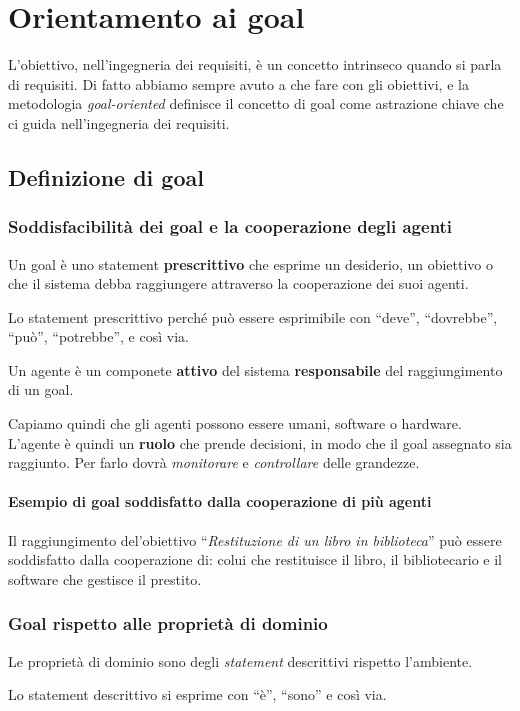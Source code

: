 \chapter{Orientamento ai goal}
L'obiettivo, nell'ingegneria dei requisiti, è un concetto intrinseco quando 
si parla di requisiti.
Di fatto abbiamo sempre avuto a che fare con gli obiettivi, e la metodologia
\textit{goal-oriented} definisce il concetto di goal come astrazione chiave che 
ci guida nell'ingegneria dei requisiti.
\section{Definizione di goal}
\subsection{Soddisfacibilità dei goal e la cooperazione degli agenti}
\begin{tcolorbox}[colback=blue!5!white,colframe=blue!75!black, title=Goal]
  Un goal è uno statement \textbf{prescrittivo} che esprime un desiderio, un obiettivo o
  che il sistema debba raggiungere attraverso la cooperazione dei suoi agenti.
\end{tcolorbox}
Lo statement prescrittivo perché può essere esprimibile con ``deve'', ``dovrebbe'', 
``può'', ``potrebbe'', e così via.
\begin{tcolorbox}[colback=cyan!5!white,colframe=cyan!75!black, title=Agente]
    Un agente è un componete \textbf{attivo} del sistema \textbf{responsabile} del raggiungimento
    di un goal.
\end{tcolorbox}
Capiamo quindi che gli agenti possono essere umani, software o hardware. L'agente è quindi 
un \textbf{ruolo} che prende decisioni, in modo che il goal assegnato sia raggiunto.
Per farlo dovrà \textit{monitorare} e \textit{controllare} delle grandezze.
\subsubsection{Esempio di goal soddisfatto dalla cooperazione di più agenti}
Il raggiungimento del'obiettivo ``\textit{Restituzione di un libro in biblioteca}''
può essere soddisfatto dalla cooperazione di: colui che restituisce il libro, 
il bibliotecario e il software che gestisce il prestito.
\subsection{Goal rispetto alle proprietà di dominio}
\begin{tcolorbox}[colback=violet!5!white,colframe=violet!75!black, title=Proprietà di Dominio]
    Le proprietà di dominio sono degli \textit{statement} descrittivi rispetto 
    l'ambiente.
\end{tcolorbox}
Lo statement descrittivo si esprime con ``è'', ``sono'' e così via.

